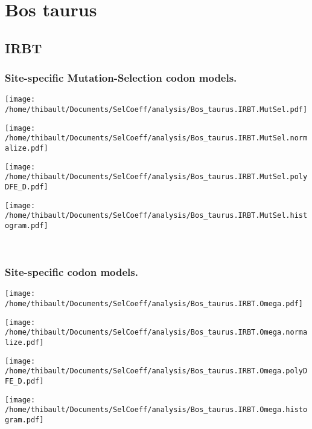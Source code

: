 \section{Bos taurus} 
 
\subsection{IRBT} 
 
\subsubsection*{Site-specific Mutation-Selection codon models.} 
\begin{minipage}{0.49\linewidth} 
\texttt{[image: /home/thibault/Documents/SelCoeff/analysis/Bos\_taurus.IRBT.MutSel.pdf]} 
\end{minipage}
\begin{minipage}{0.49\linewidth} 
\texttt{[image: /home/thibault/Documents/SelCoeff/analysis/Bos\_taurus.IRBT.MutSel.normalize.pdf]} 
\end{minipage}
\begin{minipage}{0.49\linewidth} 
\texttt{[image: /home/thibault/Documents/SelCoeff/analysis/Bos\_taurus.IRBT.MutSel.polyDFE\_D.pdf]} 
\end{minipage}
\begin{minipage}{0.49\linewidth} 
\texttt{[image: /home/thibault/Documents/SelCoeff/analysis/Bos\_taurus.IRBT.MutSel.histogram.pdf]} 
\end{minipage}
\\ 
\subsubsection*{Site-specific codon models.} 
\begin{minipage}{0.49\linewidth} 
\texttt{[image: /home/thibault/Documents/SelCoeff/analysis/Bos\_taurus.IRBT.Omega.pdf]} 
\end{minipage}
\begin{minipage}{0.49\linewidth} 
\texttt{[image: /home/thibault/Documents/SelCoeff/analysis/Bos\_taurus.IRBT.Omega.normalize.pdf]} 
\end{minipage}
\begin{minipage}{0.49\linewidth} 
\texttt{[image: /home/thibault/Documents/SelCoeff/analysis/Bos\_taurus.IRBT.Omega.polyDFE\_D.pdf]} 
\end{minipage}
\begin{minipage}{0.49\linewidth} 
\texttt{[image: /home/thibault/Documents/SelCoeff/analysis/Bos\_taurus.IRBT.Omega.histogram.pdf]} 
\end{minipage}
\\ 
